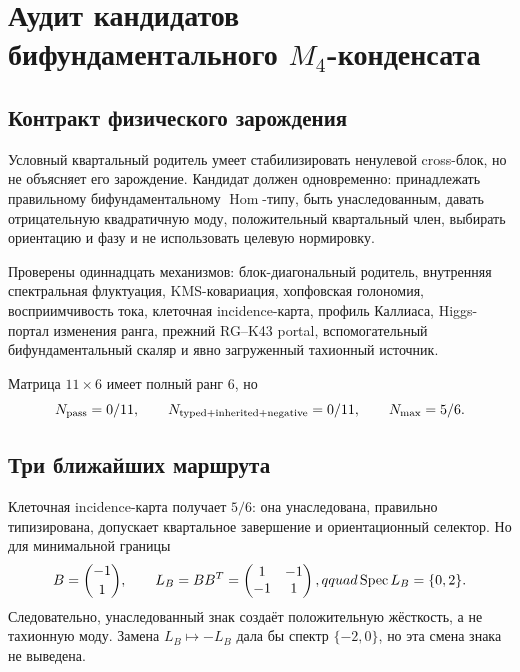 \chapter{Аудит кандидатов бифундаментального
\texorpdfstring{$M_4$}{M4}-конденсата}
\label{ch:v10-hopf-reservoir-bifundamental-audit}

\section{Контракт физического зарождения}

Условный квартальный родитель умеет стабилизировать ненулевой cross-блок,
но не объясняет его зарождение. Кандидат должен одновременно:
принадлежать правильному бифундаментальному $\operatorname{Hom}$-типу,
быть унаследованным, давать отрицательную квадратичную моду, положительный
квартальный член, выбирать ориентацию и фазу и не использовать целевую
нормировку.

Проверены одиннадцать механизмов: блок-диагональный родитель, внутренняя
спектральная флуктуация, KMS-ковариация, хопфовская голономия,
восприимчивость тока, клеточная incidence-карта, профиль Каллиаса,
Higgs-портал изменения ранга, прежний RG--K43 portal, вспомогательный
бифундаментальный скаляр и явно загруженный тахионный источник.

Матрица $11\times6$ имеет полный ранг $6$, но
\begin{equation}
 N_{\rm pass}=0/11,
 \qquad N_{\rm typed+inherited+negative}=0/11,
 \qquad N_{\rm max}=5/6.
\end{equation}

\section{Три ближайших маршрута}

Клеточная incidence-карта получает $5/6$: она унаследована, правильно
типизирована, допускает квартальное завершение и ориентационный селектор.
Но для минимальной границы
\begin{equation}
 B=\binom{-1}{1},\qquad
 L_B=BB^T=\begin{pmatrix}1&-1\\-1&1\end{pmatrix},qquad
 \operatorname{Spec} L_B=\{0,2\}.
\end{equation}
Следовательно, унаследованный знак создаёт положительную жёсткость, а не
тахионную моду. Замена $L_B\mapsto-L_B$ дала бы спектр $\{-2,0\}$, но эта
смена знака не выведена.

